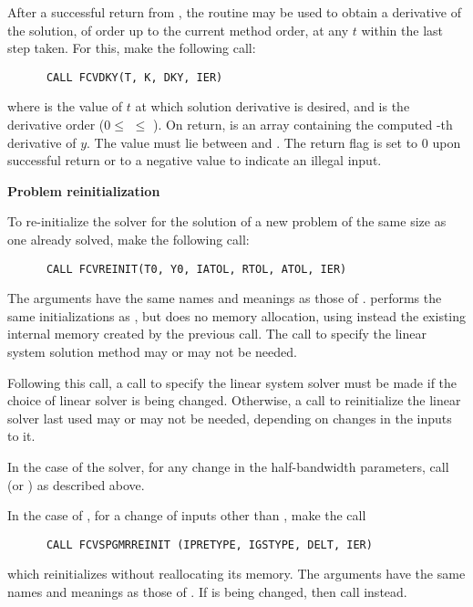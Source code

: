 \begin{Steps}
  After a successful return from , the routine  may be
  used to obtain a derivative of the solution, of order up to the current method
  order, at any $t$ within the last step taken.  For this, make the following call:
\begin{verbatim}
      CALL FCVDKY(T, K, DKY, IER)
\end{verbatim}
  where
   is the value of $t$ at which solution derivative is desired, and
   is the derivative order ($0 \le$  $\le$ ).
  On return,  is an array containing the computed -th derivative
  of $y$.  The value  must lie between  and .
  The return flag  is set to $0$ upon successful return or to a negative
  value to indicate an illegal input.
  
\item {\bf Problem reinitialization}

  To re-initialize the {\cvode} solver for the solution of a new problem
  of the same size as one already solved, make the following call:
\begin{verbatim}
      CALL FCVREINIT(T0, Y0, IATOL, RTOL, ATOL, IER)
\end{verbatim}
  The arguments have the same names and meanings as those of .
   performs the same initializations as
  , but does no memory allocation, using instead the existing
  internal memory created by the previous  call.  The call to
  specify the linear system solution method may or may not be needed.

  Following this call, a call to specify the linear system solver must be
  made if the choice of linear solver is being changed.  Otherwise, a call
  to reinitialize the linear solver last used may or may not be needed,
  depending on changes in the inputs to it.

  In the case of the {\band} solver, for any change in the half-bandwidth
  parameters, call  (or ) as described above.

  In the case of {\spgmr}, for a change of inputs other than ,
  make the call
\begin{verbatim}
      CALL FCVSPGMRREINIT (IPRETYPE, IGSTYPE, DELT, IER)
\end{verbatim}
  which reinitializes {\spgmr} without reallocating its memory.
  The arguments have the same names and meanings as those of .
  If  is being changed, then call  instead.


\end{Steps}
